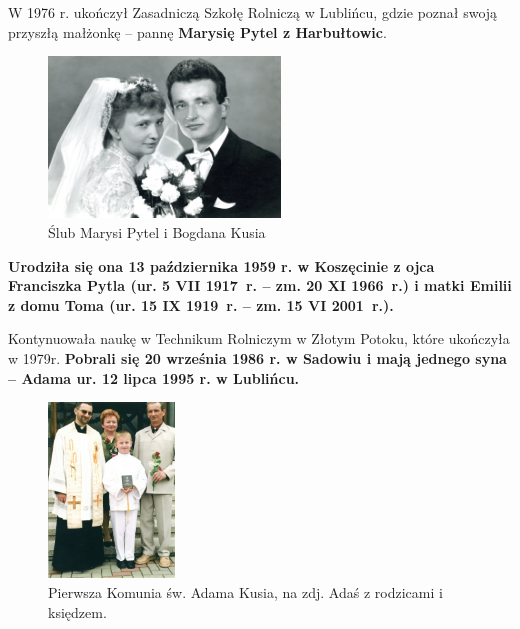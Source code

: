 W 1976 r. ukończył Zasadniczą Szkołę Rolniczą w Lublińcu, gdzie poznał swoją przyszłą małżonkę -- pannę \textbf{Marysię Pytel z Harbułtowic}.

\begin{figure}[!h]
\begin{center}
\includegraphics[width=0.55\textwidth]{photo/bogdan_marysia_kus_slub_1.jpg}
\caption{Ślub Marysi Pytel i Bogdana Kusia}
\label{rys:bogdan_marysia_kus_slub_1}
\end{center}
\end{figure}

\textbf{Urodziła się ona 13 października 1959 r. w Koszęcinie z ojca Franciszka Pytla (ur. 5 VII 1917~r. – zm. 20 XI 1966~r.) i matki Emilii z domu Toma (ur. 15 IX 1919~r. – zm. 15 VI 2001~r.).}

Kontynuowała naukę w Technikum Rolniczym w Złotym Potoku, które ukończyła w 1979r. \textbf{Pobrali się 20 września 1986 r. w Sadowiu i mają jednego syna – Adama ur. 12 lipca 1995 r. w Lublińcu.}

\begin{figure}[!h]
\begin{center}
\includegraphics[width=0.3\textwidth]{photo/adam_kus_komunia.jpg}
\caption[Pierwsza Komunia św. Adama Kusia]{Pierwsza Komunia św. Adama Kusia, na zdj. Adaś z rodzicami i księdzem.}
\label{rys:adam_kus_komunia}
\end{center}
\end{figure}

